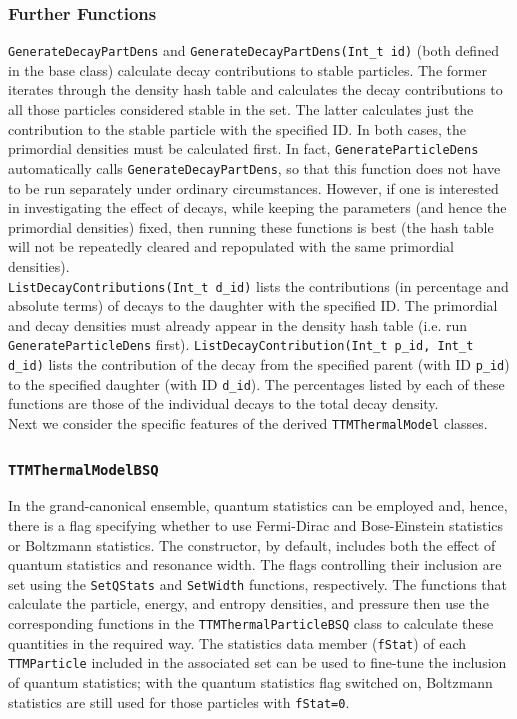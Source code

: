 \documentclass{elsarticle}
\begin{document}
\subsubsection{Further Functions}

\texttt{GenerateDecayPartDens} and \texttt{GenerateDecayPartDens(Int\_t id)} 
 (both defined in the 
base class) calculate 
decay contributions to stable particles. The former iterates through the density hash table and calculates 
the decay contributions to all those particles considered stable in the set. The latter calculates 
just the contribution to the stable particle with the specified ID. In both cases, the primordial densities 
must be 
calculated first. In fact, \texttt{GenerateParticleDens} automatically calls 
\texttt{GenerateDecayPartDens}, so that this 
function does not have to be run separately under ordinary circumstances. However, if one is interested 
in investigating the effect of decays, while keeping the parameters (and hence the primordial densities) 
fixed, then running these functions is best (the hash table will not be repeatedly cleared and repopulated 
with the same primordial densities).\\

\texttt{ListDecayContributions(Int\_t d\_id)} lists the contributions (in percentage and absolute terms) of 
decays to the daughter with the specified ID. The primordial and decay densities must already appear in 
the density 
hash table (i.e. run \texttt{GenerateParticleDens} first). \texttt{ListDecayContribution(Int\_t p\_id,
Int\_t d\_id)} lists the contribution of the decay from the specified parent (with ID \texttt{p\_id}) to 
the specified daughter (with ID \texttt{d\_id}). The percentages listed by each of these functions are 
those of the individual decays to the total decay density.\\

Next we consider the specific features of the derived \texttt{TTMThermalModel} 
classes.

\subsubsection{\texttt{TTMThermalModelBSQ}}

In the grand-canonical ensemble, quantum statistics can be employed and, hence, there is a flag specifying 
whether to use Fermi-Dirac and Bose-Einstein statistics or Boltzmann statistics. The constructor, by default, includes both the effect of quantum statistics and resonance width. 
The flags controlling their inclusion are set using the 
\texttt{SetQStats} and \texttt{SetWidth} functions, respectively. The 
functions that calculate the particle, energy, and entropy densities, and pressure then use the 
corresponding functions in the \texttt{TTMThermalParticleBSQ} class to calculate these quantities in the 
required way. The statistics data member (\texttt{fStat}) of each 
\texttt{TTMParticle} included in the associated set can be used to fine-tune 
the inclusion of quantum statistics; with the quantum statistics flag switched 
on, Boltzmann statistics are still used for those particles with 
\texttt{fStat=0}.\\ 
\end{document}
